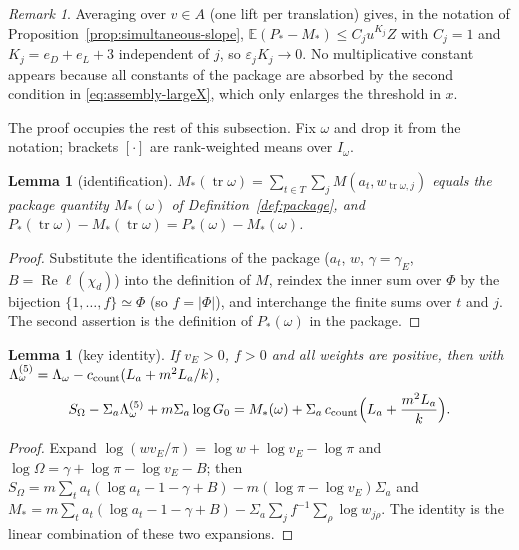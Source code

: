 \documentclass[10pt]{amsart}
\newtheorem{lemma}[theorem]{Lemma}
\theoremstyle{definition}
\theoremstyle{remark}
\newtheorem{remark}[theorem]{Remark}
\newcommand{\Rel}{\operatorname{Re}}
\begin{document}
\begin{remark}\label{rem:mean-bound-paper}
Averaging over $v\in A$ (one lift per translation) gives, in the notation of
Proposition~\ref{prop:simultaneous-slope},
$\mathbb E(P_*-M_*)\le C_ju^{K_j}Z$ with $C_j=1$ and $K_j=e_D+e_L+3$
independent of $j$, so $\varepsilon_jK_j\to0$. No
multiplicative constant appears because all constants of the package are
absorbed by the second condition in \eqref{eq:assembly-largeX}, which only
enlarges the threshold in $x$.
\end{remark}

The proof occupies the rest of this subsection. Fix $\omega$ and drop it from
the notation; brackets $[\cdot]$ are rank-weighted means over $I_\omega$.

\begin{lemma}[identification]\label{lem:ident}
$M_*(\operatorname{tr}\omega)=\sum_{t\in T}\sum_j M(a_t,w_{\operatorname{tr}\omega,j})$
equals the package quantity $M_*(\omega)$ of Definition~\ref{def:package}, and
$P_*(\operatorname{tr}\omega)-M_*(\operatorname{tr}\omega)=P_*(\omega)-M_*(\omega)$.
\end{lemma}
\begin{proof}
Substitute the identifications of the package ($a_t$, $w$, $\gamma=\gamma_E$,
$B=\Rel\ell(\chi_d)$) into the definition of $M$, reindex the inner sum over
$\Phi$ by the bijection $\{1,\dots,f\}\simeq\Phi$ (so $f=|\Phi|$), and interchange
the finite sums over $t$ and $j$. The second assertion is the definition of
$P_*(\omega)$ in the package.
\end{proof}

\begin{lemma}[key identity]\label{lem:key-identity}
If $v_E>0$, $f>0$ and all weights are positive, then with
$\Lambda^{(5)}_\omega=\Lambda_\omega-c_{\rm count}(L_a+m^2L_a/k)$,
\[
 S_\Omega-\Sigma_a\Lambda^{(5)}_\omega+m\Sigma_a\log G_0=M_*(\omega)+\Sigma_a\,c_{\rm count}\Bigl(L_a+\frac{m^2L_a}k\Bigr).
\]
\end{lemma}
\begin{proof}
Expand $\log(w v_E/\pi)=\log w+\log v_E-\log\pi$ and
$\log\Omega=\gamma+\log\pi-\log v_E-B$; then
$S_\Omega=m\sum_ta_t(\log a_t-1-\gamma+B)-m(\log\pi-\log v_E)\Sigma_a$ and
$M_*=m\sum_ta_t(\log a_t-1-\gamma+B)-\Sigma_a\sum_jf^{-1}\sum_\rho\log w_{j\rho}$.
The identity is the linear combination of these two expansions.
\end{proof}
\end{document}
